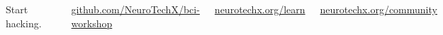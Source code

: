 \documentclass[aspectratio=169,11pt,t]{beamer}
\begin{document}
\begin{NTXDarkFrame}
  \begin{columns}[c,onlytextwidth]
      \NTXBadge[13.5mm]\par\vspace{5mm}
      {\NTXSerif\fontsize{25}{29}\selectfont\color{NTXInk}Start hacking.\par}
      \vspace{4mm}
      {\color{NTXRuleActive}\rule{18mm}{0.6pt}\par}\vspace{4mm}
      {\NTXSans\small\color{NTXMuted}
        \href{https://github.com/NeuroTechX/bci-workshop}{github.com/NeuroTechX/bci-workshop}\par\smallskip
        \href{https://neurotechx.org/learn}{neurotechx.org/learn}\par\smallskip
        \href{https://neurotechx.org/community}{neurotechx.org/community}\par
      }
      \centering
      {\setlength{\fboxsep}{3mm}\colorbox{white}{\color{black}}}
  \end{columns}
\end{NTXDarkFrame}
\end{document}

